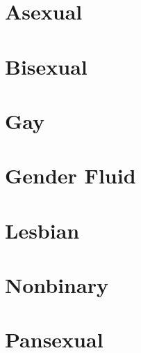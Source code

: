 \section*{Asexual}


\section*{Bisexual}


\section*{Gay}


\section*{Gender Fluid}


\section*{Lesbian}


\section*{Nonbinary}


\section*{Pansexual}

